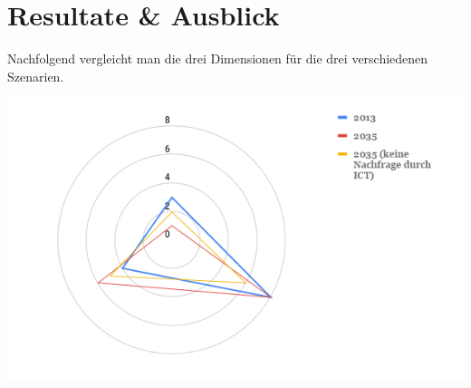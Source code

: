 \section{Resultate \& Ausblick}\label{sec:conflict}

Nachfolgend vergleicht man die drei Dimensionen für die drei verschiedenen Szenarien.

\begin{center}
\includegraphics[width=14cm]{images/tantal-results}
\end{center}
